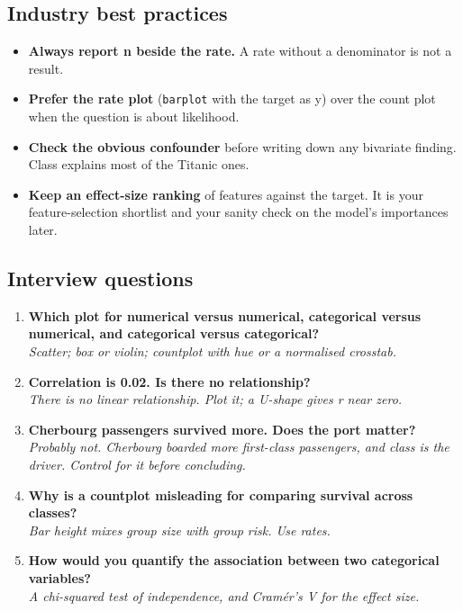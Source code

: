 \documentclass[11pt,a4paper]{article}
\begin{document}
\subsection*{Industry best practices}

\begin{itemize}\itemsep3pt
  \item \textbf{Always report n beside the rate.} A rate without a denominator is not a
        result.
  \item \textbf{Prefer the rate plot} (\lstinline|barplot| with the target as y) over the
        count plot when the question is about likelihood.
  \item \textbf{Check the obvious confounder} before writing down any bivariate finding.
        Class explains most of the Titanic ones.
  \item \textbf{Keep an effect-size ranking} of features against the target. It is your
        feature-selection shortlist and your sanity check on the model's importances later.
\end{itemize}

\subsection*{Interview questions}

\begin{enumerate}\itemsep4pt
  \item \textbf{Which plot for numerical versus numerical, categorical versus numerical, and
        categorical versus categorical?}\\
        \emph{Scatter; box or violin; countplot with hue or a normalised crosstab.}
  \item \textbf{Correlation is 0.02. Is there no relationship?}\\
        \emph{There is no \emph{linear} relationship. Plot it; a U-shape gives r near zero.}
  \item \textbf{Cherbourg passengers survived more. Does the port matter?}\\
        \emph{Probably not. Cherbourg boarded more first-class passengers, and class is the
        driver. Control for it before concluding.}
  \item \textbf{Why is a countplot misleading for comparing survival across classes?}\\
        \emph{Bar height mixes group size with group risk. Use rates.}
  \item \textbf{How would you quantify the association between two categorical variables?}\\
        \emph{A chi-squared test of independence, and Cramér's V for the effect size.}
\end{enumerate}
\end{document}

